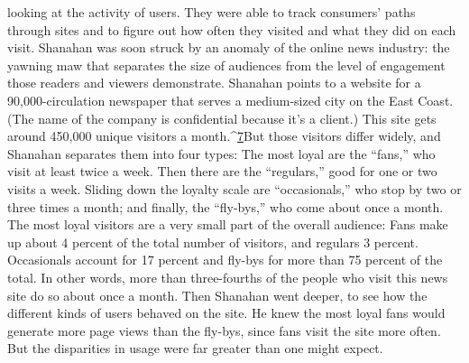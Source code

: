 looking at the activity of users. They were able to track consumers’ paths through
sites and to figure out how often they visited and what they did on each visit.
Shanahan was soon struck by an anomaly of the online news industry: the yawning
maw that separates the size of audiences from the level of engagement those
readers and viewers demonstrate.
Shanahan points to a website for a 90,000-circulation newspaper that serves a
medium-sized city on the East Coast. (The name of the company is confidential
because it’s a client.) This site gets around 450,000 unique visitors a month.^{\href{#endnotes-ch2}{7}}But those visitors differ widely, and Shanahan separates them into four types:
The most loyal are the ``fans,'' who visit at least twice a week. Then there are the
``regulars,'' good for one or two visits a week. Sliding down the loyalty scale are
``occasionals,'' who stop by two or three times a month; and finally, the ``fly-bys,''
who come about once a month.
The most loyal visitors are a very small part of the overall audience: Fans make
up about 4 percent of the total number of visitors, and regulars 3 percent. Occasionals
account for 17 percent and fly-bys for more than 75 percent of the total.
In other words, more than three-fourths of the people who visit this news site
do so about once a month.
Then Shanahan went deeper, to see how the different kinds of users behaved
on the site. He knew the most loyal fans would generate more page views than
the fly-bys, since fans visit the site more often. But the disparities in usage were
far greater than one might expect.

